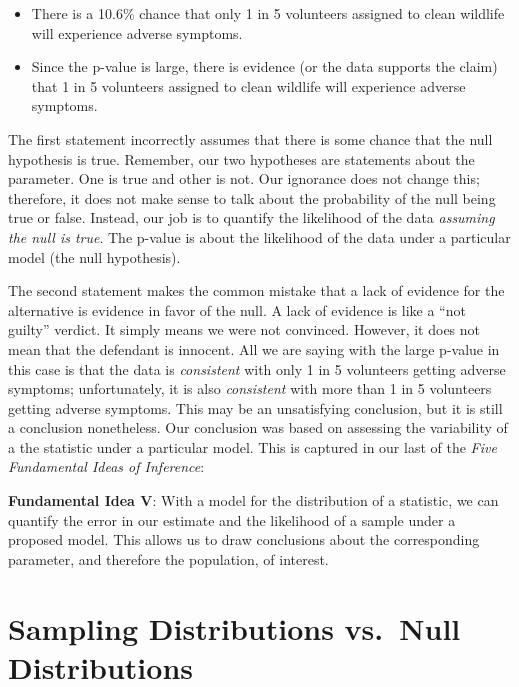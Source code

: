 \documentclass[]{book}
\providecommand{\tightlist}{%
  \setlength{\itemsep}{0pt}\setlength{\parskip}{0pt}}
\theoremstyle{definition}
\theoremstyle{definition}
\theoremstyle{definition}
\theoremstyle{remark}
\let\BeginKnitrBlock\begin \let\EndKnitrBlock\end
\begin{document}
\begin{itemize}
\tightlist
\item
  There is a 10.6\% chance that only 1 in 5 volunteers assigned to clean
  wildlife will experience adverse symptoms.
\item
  Since the p-value is large, there is evidence (or the data supports
  the claim) that 1 in 5 volunteers assigned to clean wildlife will
  experience adverse symptoms.
\end{itemize}

The first statement incorrectly assumes that there is some chance that
the null hypothesis is true. Remember, our two hypotheses are statements
about the parameter. One is true and other is not. Our ignorance does
not change this; therefore, it does not make sense to talk about the
probability of the null being true or false. Instead, our job is to
quantify the likelihood of the data \emph{assuming the null is true}.
The p-value is about the likelihood of the data under a particular model
(the null hypothesis).

The second statement makes the common mistake that a lack of evidence
for the alternative is evidence in favor of the null. A lack of evidence
is like a ``not guilty'' verdict. It simply means we were not convinced.
However, it does not mean that the defendant is innocent. All we are
saying with the large p-value in this case is that the data is
\emph{consistent} with only 1 in 5 volunteers getting adverse symptoms;
unfortunately, it is also \emph{consistent} with more than 1 in 5
volunteers getting adverse symptoms. This may be an unsatisfying
conclusion, but it is still a conclusion nonetheless. Our conclusion was
based on assessing the variability of a the statistic under a particular
model. This is captured in our last of the \emph{Five Fundamental Ideas
of Inference}:

\BeginKnitrBlock{rmdfivefund}
\textbf{Fundamental Idea V}: With a model for the distribution of a
statistic, we can quantify the error in our estimate and the likelihood
of a sample under a proposed model. This allows us to draw conclusions
about the corresponding parameter, and therefore the population, of
interest.
\EndKnitrBlock{rmdfivefund}

\section{Sampling Distributions vs.~Null
Distributions}\label{sampling-distributions-vs.null-distributions}
\end{document}
